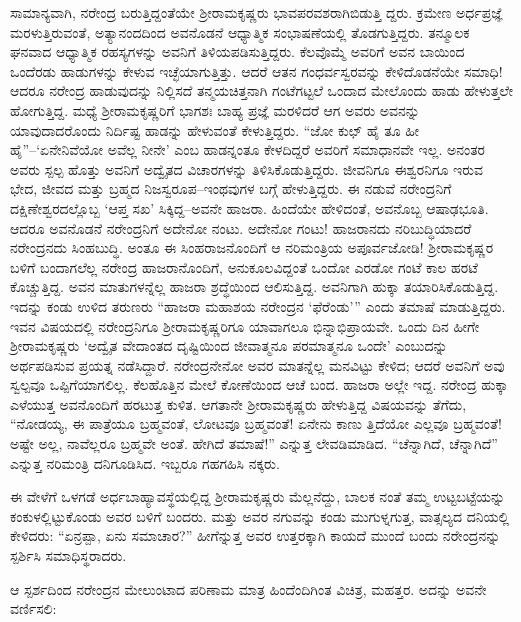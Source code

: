 ಸಾಮಾನ್ಯವಾಗಿ, ನರೇಂದ್ರ ಬರುತ್ತಿದ್ದಂತೆಯೇ ಶ್ರೀರಾಮಕೃಷ್ಣರು ಭಾವಪರವಶರಾಗಿಬಿಡುತ್ತಿ ದ್ದರು. ಕ್ರಮೇಣ ಅರ್ಧಪ್ರಜ್ಞೆ ಮರಳುತ್ತಿರುವಂತೆ, ಅತ್ಯಾನಂದದಿಂದ ಅವನೊಡನೆ ಆಧ್ಯಾತ್ಮಿಕ ಸಂಭಾಷಣೆಯಲ್ಲಿ ತೊಡಗುತ್ತಿದ್ದರು. ತನ್ಮೂಲಕ ಘನವಾದ ಆಧ್ಯಾತ್ಮಿಕ ರಹಸ್ಯಗಳನ್ನು ಅವನಿಗೆ ತಿಳಿಯಪಡಿಸುತ್ತಿದ್ದರು. ಕೆಲವೊಮ್ಮೆ ಅವರಿಗೆ ಅವನ ಬಾಯಿಂದ ಒಂದೆರಡು ಹಾಡುಗಳನ್ನು ಕೇಳುವ ಇಚ್ಛೆಯಾಗುತ್ತಿತ್ತು. ಆದರೆ ಆತನ ಗಂಧರ್ವಸ್ವರವನ್ನು ಕೇಳಿದೊಡನೆಯೇ ಸಮಾಧಿ! ಆದರೂ ನರೇಂದ್ರ ಹಾಡುವುದನ್ನು ನಿಲ್ಲಿಸದೆ ತನ್ಮಯಚಿತ್ತನಾಗಿ ಗಂಟೆಗಟ್ಟಲೆ ಒಂದಾದ ಮೇಲೊಂದು ಹಾಡು ಹೇಳುತ್ತಲೇ ಹೋಗುತ್ತಿದ್ದ. ಮಧ್ಯೆ ಶ್ರೀರಾಮಕೃಷ್ಣರಿಗೆ ಭಾಗಶಃ ಬಾಹ್ಯ ಪ್ರಜ್ಞೆ ಮರಳಿದರೆ ಆಗ ಅವರು ಅವನನ್ನು ಯಾವುದಾದರೊಂದು ನಿರ್ದಿಷ್ಟ ಹಾಡನ್ನು ಹೇಳುವಂತೆ ಕೇಳುತ್ತಿದ್ದರು. “ಜೋ ಕುಛ್ ಹೈ ತೂ ಹೀ ಹೈ”–‘ಏನೇನಿವೆಯೋ ಅವೆಲ್ಲ ನೀನೇ’ ಎಂಬ ಹಾಡನ್ನಂತೂ ಕೇಳದಿದ್ದರೆ ಅವರಿಗೆ ಸಮಾಧಾನವೇ ಇಲ್ಲ. ಅನಂತರ ಅವರು ಸ್ಪಲ್ಪ ಹೊತ್ತು ಅವನಿಗೆ ಅದ್ವೈತದ ವಿಚಾರಗಳನ್ನು ತಿಳಿಸಿಕೊಡುತ್ತಿದ್ದರು. ಜೀವನಿಗೂ ಈಶ್ವರನಿಗೂ ಇರುವ ಭೇದ, ಜೀವದ ಮತ್ತು ಬ್ರಹ್ಮದ ನಿಜಸ್ವರೂಪ–ಇಂಥವುಗಳ ಬಗ್ಗೆ ಹೇಳುತ್ತಿದ್ದರು. ಈ ನಡುವೆ ನರೇಂದ್ರನಿಗೆ ದಕ್ಷಿಣೇಶ್ವರದಲ್ಲೊಬ್ಬ ‘ಆಪ್ತ ಸಖ’ ಸಿಕ್ಕಿದ್ದ–ಅವನೇ ಹಾಜರಾ. ಹಿಂದೆಯೇ ಹೇಳಿದಂತೆ, ಅವನೊಬ್ಬ ಆಷಾಢಭೂತಿ. ಆದರೂ ಅವನೊಡನೆ ನರೇಂದ್ರನಿಗೆ ಅದೇನೋ ನಂಟು. ಅದೇನೋ ಗಂಟು! ಹಾಜರಾನದು ನರಿಬುದ್ಧಿಯಾದರೆ ನರೇಂದ್ರನದು ಸಿಂಹಬುದ್ಧಿ. ಅಂತೂ ಈ ಸಿಂಹರಾಜನೊಂದಿಗೆ ಆ ನರಿಮಂತ್ರಿಯ ಅಪೂರ್ವಜೋಡಿ! ಶ್ರೀರಾಮಕೃಷ್ಣರ ಬಳಿಗೆ ಬಂದಾಗಲೆಲ್ಲ ನರೇಂದ್ರ ಹಾಜರಾನೊಂದಿಗೆ, ಅನುಕೂಲವಿದ್ದಂತೆ ಒಂದೋ ಎರಡೋ ಗಂಟೆ ಕಾಲ ಹರಟೆ ಕೊಚ್ಚುತ್ತಿದ್ದ. ಅವನ ಮಾತುಗಳನ್ನೆಲ್ಲ ಹಾಜರಾ ಶ್ರದ್ಧೆಯಿಂದ ಆಲಿಸುತ್ತಿದ್ದ. ಅವನಿಗಾಗಿ ಹುಕ್ಕಾ ತಯಾರಿಸಿಕೊಡುತ್ತಿದ್ದ. ಇದನ್ನು ಕಂಡು ಉಳಿದ ತರುಣರು “ಹಾಜರಾ ಮಹಾಶಯ ನರೇಂದ್ರನ ‘ಫೆರೆಂಡು’” ಎಂದು ತಮಾಷೆ ಮಾಡುತ್ತಿದ್ದರು. ಇವನ ವಿಷಯದಲ್ಲಿ ನರೇಂದ್ರನಿಗೂ ಶ್ರೀರಾಮಕೃಷ್ಣರಿಗೂ ಯಾವಾಗಲೂ ಭಿನ್ನಾಭಿಪ್ರಾಯವೇ. ಒಂದು ದಿನ ಹೀಗೇ ಶ್ರೀರಾಮಕೃಷ್ಣರು ‘ಅದ್ವೈತ ವೇದಾಂತದ ದೃಷ್ಟಿಯಿಂದ ಜೀವಾತ್ಮನೂ ಪರಮಾತ್ಮನೂ ಒಂದೇ’ ಎಂಬುದನ್ನು ಅರ್ಥಪಡಿಸುವ ಪ್ರಯತ್ನ ನಡೆಸಿದ್ದಾರೆ. ನರೇಂದ್ರನೇನೋ ಅವರ ಮಾತನ್ನೆಲ್ಲ ಮನವಿಟ್ಟು ಕೇಳಿದ; ಆದರೆ ಅವನಿಗೆ ಅವು ಸ್ವಲ್ಪವೂ ಒಪ್ಪಿಗೆಯಾಗಲಿಲ್ಲ. ಕೆಲಹೊತ್ತಿನ ಮೇಲೆ ಕೋಣೆಯಿಂದ ಆಚೆ ಬಂದ. ಹಾಜರಾ ಅಲ್ಲೇ ಇದ್ದ. ನರೇಂದ್ರ ಹುಕ್ಕಾ ಎಳೆಯುತ್ತ ಅವನೊಂದಿಗೆ ಹರಟುತ್ತ ಕುಳಿತ. ಆಗತಾನೇ ಶ್ರೀರಾಮಕೃಷ್ಣರು ಹೇಳುತ್ತಿದ್ದ ವಿಷಯವನ್ನು ತೆಗೆದು, “ನೋಡಯ್ಯ, ಈ ಪಾತ್ರೆಯೂ ಬ್ರಹ್ಮವಂತೆ, ಲೋಟವೂ ಬ್ರಹ್ಮವಂತೆ! ಏನೇನು ಕಾಣು ತ್ತಿದೆಯೋ ಎಲ್ಲವೂ ಬ್ರಹ್ಮವಂತೆ! ಅಷ್ಟೇ ಅಲ್ಲ, ನಾವೆಲ್ಲರೂ ಬ್ರಹ್ಮವೇ ಅಂತೆ. ಹೇಗಿದೆ ತಮಾಷೆ!” ಎನ್ನುತ್ತ ಲೇವಡಿಮಾಡಿದ. “ಚೆನ್ನಾಗಿದೆ, ಚೆನ್ನಾಗಿದೆ” ಎನ್ನುತ್ತ ನರಿಮಂತ್ರಿ ದನಿಗೂಡಿಸಿದ. ಇಬ್ಬರೂ ಗಹಗಹಿಸಿ ನಕ್ಕರು.

ಈ ವೇಳೆಗೆ ಒಳಗಡೆ ಅರ್ಧಬಾಹ್ಯಾವಸ್ಥೆಯಲ್ಲಿದ್ದ ಶ್ರೀರಾಮಕೃಷ್ಣರು ಮೆಲ್ಲನೆದ್ದು, ಬಾಲಕ ನಂತೆ ತಮ್ಮ ಉಟ್ಟಬಟ್ಟೆಯನ್ನು ಕಂಕುಳಲ್ಲಿಟ್ಟುಕೊಂಡು ಅವರ ಬಳಿಗೆ ಬಂದರು. ಮತ್ತು ಅವರ ನಗುವನ್ನು ಕಂಡು ಮುಗುಳ್ನಗುತ್ತ, ವಾತ್ಸಲ್ಯದ ದನಿಯಲ್ಲಿ ಕೇಳಿದರು: “ಏನ್ರಪ್ಪಾ, ಏನು ಸಮಾಚಾರ?” ಹೀಗೆನ್ನುತ್ತ ಅವರ ಉತ್ತರಕ್ಕಾಗಿ ಕಾಯದೆ ಮುಂದೆ ಬಂದು ನರೇಂದ್ರನನ್ನು ಸ್ಪರ್ಶಿಸಿ ಸಮಾಧಿಸ್ಥರಾದರು.

ಆ ಸ್ಪರ್ಶದಿಂದ ನರೇಂದ್ರನ ಮೇಲುಂಟಾದ ಪರಿಣಾಮ ಮಾತ್ರ ಹಿಂದೆಂದಿಗಿಂತ ವಿಚಿತ್ರ, ಮಹತ್ತರ. ಅದನ್ನು ಅವನೇ ವರ್ಣಿಸಲಿ:

